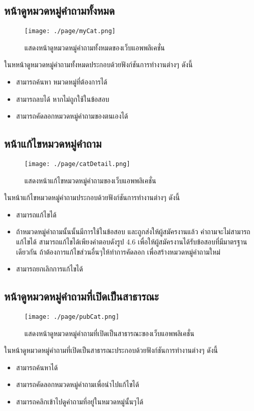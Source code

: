 \subsection{หน้าดูหมวดหมู่คำถามทั้งหมด}
\begin{figure}[H]
  \centering
  \texttt{[image: ./page/myCat.png]}
  \caption{แสดงหน้าดูหมวดหมู่คำถามทั้งหมดของเว็บแอพพลิเคชั่น}
  \label{Fig:myCat}
\end{figure}
ในหหน้าดูหมวดหมู่คำถามทั้งหมดประกอบด้วยฟังก์ชันการทำงานต่างๆ ดังนี้
\begin{itemize}
  \item สามารถค้นหา หมวดหมู่ที่ต้องการได้
  \item สามารถลบได้ หากไม่ถูกใช้ในข้อสอบ
  \item สามารถคัดลอกหมวดหมู่คำถามของตนเองได้
\end{itemize}

\subsection{หน้าแก้ไขหมวดหมู่คำถาม}
\begin{figure}[H]
  \centering
  \texttt{[image: ./page/catDetail.png]}
  \caption{แสดงหน้าแก้ไขหมวดหมู่คำถามของเว็บแอพพลิเคชั่น}
  \label{Fig:myCatDetails}
\end{figure}
ในหน้าแก้ไขหมวดหมู่คำถามประกอบด้วยฟังก์ชันการทำงานต่างๆ ดังนี้
\begin{itemize}
  \item สามารถแก้ไขได้
  \item ถ้าหมวดหมู่คำถามนั้นนั้นมีการใช้ในข้อสอบ และถูกส่งให้ผู้สมัครงานแล้ว คำถามจะไม่สามารถแก้ไขได้ สามารถแก้ไขได้เพียงคำตอบดังรูป 4.6 เพื่อให้ผู้สมัครงานได้รับข้อสอบที่มีมาตรฐานเดียวกัน ถ้าต้องการแก้ไขส่วนอื่นๆให้ทำการคัดลอก เพื่อสร้างหมวดหมู่คำถามใหม่
  \item สามารถยกเลิกการแก้ไขได้
\end{itemize}

\subsection{หน้าดูหมวดหมู่คำถามที่เปิดเป็นสาธารณะ}
\begin{figure}[H]
  \centering
  \texttt{[image: ./page/pubCat.png]}
  \caption{แสดงหน้าดูหมวดหมู่คำถามที่เปิดเป็นสาธารณะของเว็บแอพพลิเคชั่น}
  \label{Fig:pubCats}
\end{figure}
ในหน้าดูหมวดหมู่คำถามที่เปิดเป็นสาธารณะประกอบด้วยฟังก์ชันการทำงานต่างๆ ดังนี้
\begin{itemize}
  \item สามารถค้นหาได้
  \item สามารถคัดลอกหมวดหมู่คำถามเพื่อนำไปแก้ไขได้
  \item สามารถคลิกเข้าไปดูคำถามที่อยู่ในหมวดหมู่นั้นๆได้
\end{itemize}

